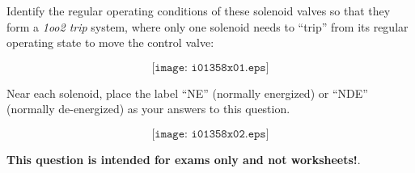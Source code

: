 

Identify the regular operating conditions of these solenoid valves so that they form a {\it 1oo2 trip} system, where only one solenoid needs to ``trip'' from its regular operating state to move the control valve:

$$\texttt{[image: i01358x01.eps]}$$

Near each solenoid, place the label ``NE'' (normally energized) or ``NDE'' (normally de-energized) as your answers to this question.







$$\texttt{[image: i01358x02.eps]}$$







{\bf This question is intended for exams only and not worksheets!}.


